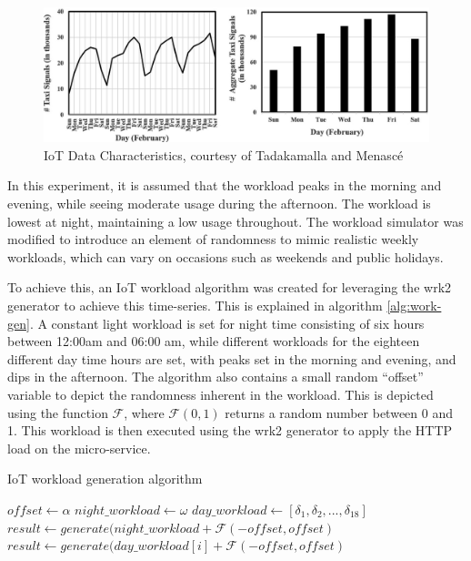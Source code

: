 \begin{figure}[htb]
    \centering
    \caption{IoT Data Characteristics, courtesy of Tadakamalla and Menasc{\'e} \cite{tadakamalla2019characterization}}
    \label{fig:iot-workload-characteristics}
    \includegraphics[width=1.0\linewidth]{Figures/IoT-Workload-Characteristics.png}
\end{figure}

In this experiment, it is assumed that the workload peaks in the morning and evening, while seeing moderate usage during the afternoon. The workload is lowest at night, maintaining a low usage throughout. The workload simulator was modified to introduce an element of randomness to mimic realistic weekly workloads, which can vary on occasions such as weekends and public holidays.\par

To achieve this, an IoT workload algorithm was created for leveraging the wrk2 generator to achieve this time-series. This is explained in algorithm \ref{alg:work-gen}. A constant light workload is set for night time consisting of six hours between 12:00am and 06:00 am, while different workloads for the eighteen different day time hours are set, with peaks set in the morning and evening, and dips in the afternoon. The algorithm also contains a small random ``offset'' variable to depict the randomness inherent in the workload. This is depicted using the function $\mathcal{F}$, where $\mathcal{F}(0,1)$ returns a random number between 0 and 1. This workload is then executed using the wrk2 generator to apply the HTTP load on the micro-service.

\begin{algorithm}
    \caption{IoT workload generation algorithm}
    \label{alg:work-gen}
    \begin{algorithmic}
        \State $offset \gets \alpha$
        \State $night\_workload \gets \omega$
        \State $day\_workload \gets [ \delta_1, \delta_2, ... , \delta_{18}]$
                \State $result \gets generate(night\_workload + \mathcal{F}(-offset,offset)$
            \EndFor
                \State $result \gets generate(day\_workload[i] + \mathcal{F}(-offset,offset)$
            \EndFor
        \EndWhile
    \end{algorithmic}
\end{algorithm}

